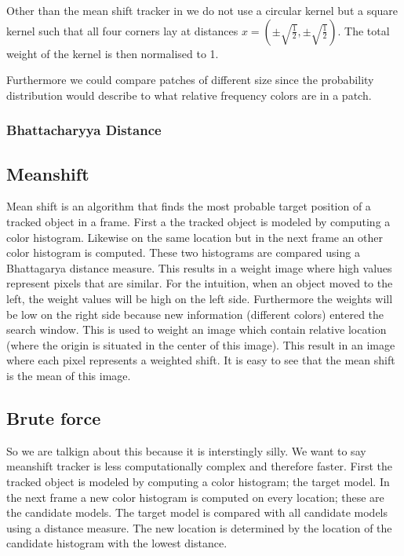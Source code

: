 \documentclass[a4paper,11pt]{article}
\begin{document}
Other than the mean shift tracker in \cite{mean_shift} we do not use a circular kernel but a square kernel such that all four corners lay at distances $x=(\pm \sqrt{\frac{1}{2}},\pm \sqrt{\frac{1}{2}})$. The total weight of the kernel is then normalised to 1.





		Furthermore we could compare patches of different size since the probability distribution would describe to what relative frequency colors are in a patch.
\subsubsection{Bhattacharyya Distance}
		
\subsection{Meanshift}
Mean shift is an algorithm that finds the most probable target position of a tracked object in a frame. First a the tracked object is modeled by computing a color histogram. Likewise on the same location but in the next frame an other color histogram is computed. These two histograms are compared using a Bhattagarya distance measure. This results in a weight image where high values represent pixels that are similar.  For the intuition, when an object moved to the left, the weight values will be high on the left side. Furthermore the weights will be low on the right side because new information (different colors) entered the search window. 
This is used to weight an image which contain relative location (where the origin is situated in the center of this image). This result in an image where each pixel represents a weighted shift. It is easy to see that the mean shift is the mean of this image.

\subsection{Brute force}
So we are talkign about this because it is interstingly silly. We want to say meanshift tracker is less computationally complex and therefore faster. 
First the tracked object is modeled by computing a color histogram; the target model. In the next frame a new color histogram is computed on every location; these are the candidate models. The target model is compared with all candidate models using a distance measure. The new location is determined by the location of the candidate histogram with the lowest distance.
		
\end{document}
